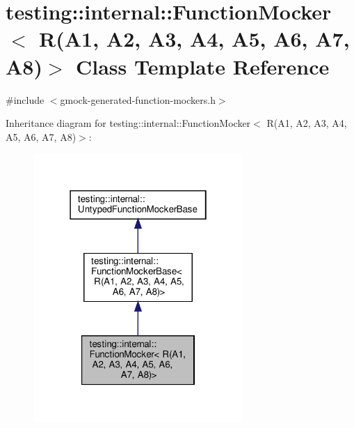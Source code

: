 \hypertarget{classtesting_1_1internal_1_1_function_mocker_3_01_r_07_a1_00_01_a2_00_01_a3_00_01_a4_00_01_a5_00_01_a6_00_01_a7_00_01_a8_08_4}{}\section{testing\+:\+:internal\+:\+:Function\+Mocker$<$ R(A1, A2, A3, A4, A5, A6, A7, A8)$>$ Class Template Reference}
\label{classtesting_1_1internal_1_1_function_mocker_3_01_r_07_a1_00_01_a2_00_01_a3_00_01_a4_00_01_a5_00_01_a6_00_01_a7_00_01_a8_08_4}


{\ttfamily \#include $<$gmock-\/generated-\/function-\/mockers.\+h$>$}



Inheritance diagram for testing\+:\+:internal\+:\+:Function\+Mocker$<$ R(A1, A2, A3, A4, A5, A6, A7, A8)$>$\+:
\nopagebreak
\begin{figure}[H]
\begin{center}
\leavevmode
\includegraphics[width=226pt]{classtesting_1_1internal_1_1_function_mocker_3_01_r_07_a1_00_01_a2_00_01_a3_00_01_a4_00_01_a5_00a9bff4bc76fdceacc66985a6fa95ea14}
\end{center}
\end{figure}


